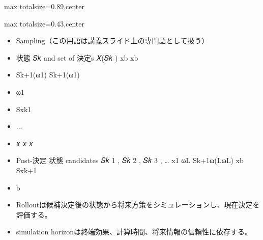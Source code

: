 \begin{minipage}[t]{0.58\textwidth}
\begin{adjustbox}{max totalsize={\textwidth}{0.89\textheight},center}
\begin{minipage}{\textwidth}
\end{minipage}
\end{adjustbox}
\end{minipage}


\clearpage
{}
\begin{minipage}[t]{0.405\textwidth}
\begin{adjustbox}{max totalsize={\textwidth}{0.43\textheight},center}
\begin{minipage}{\textwidth}\scriptsize
{}\begin{itemize}
\item Sampling（この用語は講義スライド上の専門語として扱う）
\item 状態 𝑆𝑘 and set of 決定s 𝑋(𝑆𝑘 ) xb xb
\item Sk+1(ω1) Sk+1(ω1)
\item ω1
\item Sxk1
\item ...
\item 𝑥 𝑥 𝑥
\item Post-決定 状態 candidates 𝑆𝑘 1 , 𝑆𝑘 2 , 𝑆𝑘 3 , … x1 ωL Sk+1ω(LωL) xb Sxk+1
\item b
\end{itemize}\begin{itemize}
\item Rolloutは候補決定後の状態から将来方策をシミュレーションし、現在決定を評価する。
\item simulation horizonは終端効果、計算時間、将来情報の信頼性に依存する。
\end{itemize}
\end{minipage}
\end{adjustbox}
\end{minipage}\hfill
